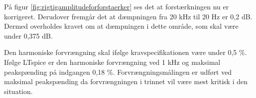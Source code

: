 På figur \ref{fig:rigtigamplitudeforforstaerker} ses det at forstærkningen nu er korrigeret. Derudover fremgår det at dæmpningen fra 20 kHz til 20 Hz er 0,2 dB. Dermed overholdes kravet om at dæmpningen i dette område, som skal være under 0,375 dB. 

Den harmoniske forvrængning skal ifølge kravspecifikationen være under 0,5 \%. Ifølge LTspice er den harmoniske forvrængning ved 1 kHz og maksimal peakspænding på indgangen 0,18 \%. Forvrængningsmålingen er udført ved maksimal peakspænding da forvrængningen i trinnet vil være mest kritisk i den situation. 






